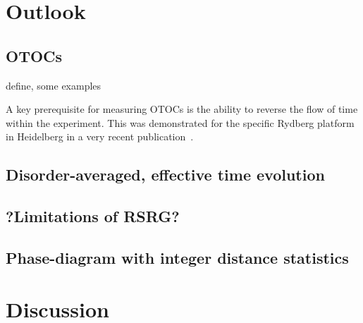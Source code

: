 \chapter{Outlook}
\section{OTOCs}
define, some examples

A key prerequisite for measuring OTOCs is the ability to reverse the flow of time within the experiment. This was demonstrated for the specific Rydberg platform in Heidelberg in a  very recent publication~\cite{geierTimereversalDipolarQuantum2024}.

\cite{muellenbachOTOC}

\section{Disorder-averaged, effective time evolution}


\section{?Limitations of RSRG?}

\section{Phase-diagram with integer distance statistics}

\chapter{Discussion}
